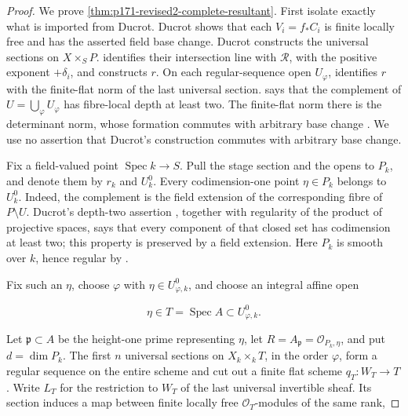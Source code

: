 
\begin{proof}
We prove \cref{thm:p171-revised2-complete-resultant}.  First isolate
exactly what is imported from Ducrot.  Ducrot
\cite[Section~2.3.3]{Ducrot97CubeIntersection} shows that each
\(V_i=f_*C_i\) is finite locally free and has the asserted field base
change.  Ducrot \cite[Section~6.3]{Ducrot97CubeIntersection} constructs the
universal sections on \(X\times_SP\).
\cite[Lemma~6.3.1]{Ducrot97CubeIntersection} identifies their intersection
line with \(\mathscr R\), with the positive exponent \(+\delta_i\), and
\cite[Definition~6.3.4]{Ducrot97CubeIntersection} constructs \(r\).  On
each regular-sequence open \(U_\varphi\),
\cite[formula~(17), Corollary~6.1.2, and Section~6.2]{Ducrot97CubeIntersection}
identifies \(r\) with the finite-flat norm of the last universal section.
\cite[Lemma~6.3.2]{Ducrot97CubeIntersection} says that the complement of
\(U=\bigcup_\varphi U_\varphi\) has fibre-local depth at least two.  The
finite-flat norm there is the determinant norm, whose formation commutes
with arbitrary base change
\cite[Lemma~31.18.6, Tag~0BD2]{stacks-project}.  We use no assertion that
Ducrot's construction \cite[Section~6.3]{Ducrot97CubeIntersection}
commutes with arbitrary base change.

Fix a field-valued point \(\operatorname{Spec}k\to S\).  Pull the stage
section and the opens to \(P_k\), and denote them by \(r_k\) and
\(U_k^0\).  Every codimension-one point \(\eta\in P_k\) belongs to
\(U_k^0\).  Indeed, the complement is the field extension of the
corresponding fibre of \(P\setminus U\).  Ducrot's depth-two assertion
\cite[Lemma~6.3.2]{Ducrot97CubeIntersection},
together with regularity of the product of projective spaces, says that
every component of that closed set has codimension at least two; this
property is preserved by a field extension.  Here \(P_k\) is smooth over
\(k\), hence regular by
\cite[Lemma~33.25.3, Tag~056S]{stacks-project}.

Fix such an \(\eta\), choose \(\varphi\) with
\(\eta\in U_{\varphi,k}^0\), and choose an integral affine open

\[
 \eta\in T=\operatorname{Spec}A\subset U_{\varphi,k}^0.
\]

Let \(\mathfrak p\subset A\) be the height-one prime representing
\(\eta\), let \(R=A_{\mathfrak p}=\mathcal O_{P_k,\eta}\), and put
\(d=\dim P_k\).  The first \(n\) universal sections on
\(X_k\times_kT\), in the order \(\varphi\), form a regular sequence on
the entire scheme and cut out a finite flat scheme \(q_T:W_T\to T\).
Write \(L_T\) for the restriction to \(W_T\) of the last universal
invertible sheaf.  Its section induces a map between finite locally free
\(\mathcal O_T\)-modules of the same rank,


\end{proof}
